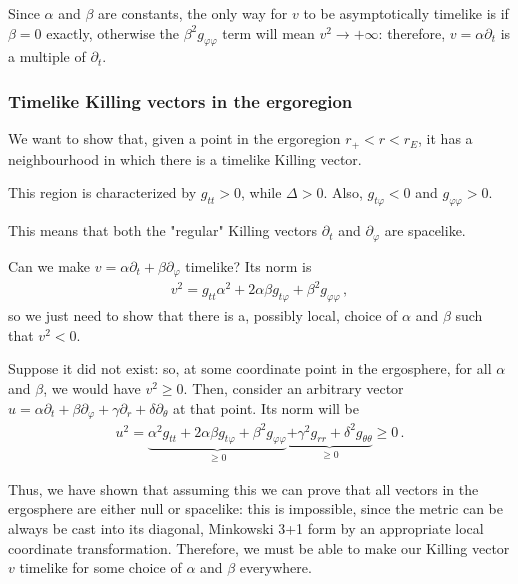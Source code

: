 \documentclass[main.tex]{subfiles}
\begin{document}
Since \(\alpha\) and \(\beta\) are constants, the only way for \(v\) to be asymptotically timelike is if \(\beta = 0\) exactly, otherwise the \(\beta^2 g_{\varphi \varphi }\) term will mean \(v^2 \to + \infty \): therefore, \(v = \alpha \partial_t\) is a multiple of \(\partial_t\). 

\subsubsection{Timelike Killing vectors in the ergoregion}

We want to show that, given a point in the ergoregion \(r_+ < r < r_E\), it has a neighbourhood in which there is a timelike Killing vector.

This region is characterized by \(g_{tt} > 0\), while \(\Delta > 0\).
Also, \(g_{t \varphi } < 0\) and \(g_{\varphi \varphi } > 0\). 

This means that both the "regular" Killing vectors \(\partial_t\) and \(\partial_\varphi \) are spacelike. 

Can we make \(v = \alpha \partial_t + \beta \partial_\varphi \) timelike?
Its norm is 
%
\begin{align}
v^2 = g_{tt} \alpha^2 + 2 \alpha \beta g_{t \varphi } + \beta^2 g_{\varphi \varphi }
\,,
\end{align}
%
so we just need to show that there is a, possibly local, choice of \(\alpha \) and \(\beta \) such that \(v^2 < 0\).

Suppose it did not exist: so, at some coordinate point in the ergosphere, for all \(\alpha \) and \(\beta \), we would have \(v^2 \geq 0\). 
Then, consider an arbitrary vector \(u = \alpha \partial_t + \beta \partial_\varphi + \gamma \partial_r + \delta \partial_\theta \) at that point. 
Its norm will be  
%
\begin{align}
u^2 = \underbrace{\alpha^2 g_{tt} + 2 \alpha \beta g_{t \varphi } + \beta^2 g_{\varphi \varphi }}_{\geq 0} \underbrace{+ \gamma^2 g_{rr} + \delta^2 g_{\theta \theta }}_{\geq 0} \geq 0
\,.
\end{align}

Thus, we have shown that assuming this we can prove that all vectors in the ergosphere are either null or spacelike: 
this is impossible, since the metric can be always be cast into its diagonal, Minkowski 3+1 form by an appropriate local coordinate transformation.
Therefore, we must be able to make our Killing vector \(v\) timelike for some choice of \(\alpha \) and \(\beta \) everywhere.
\end{document}
